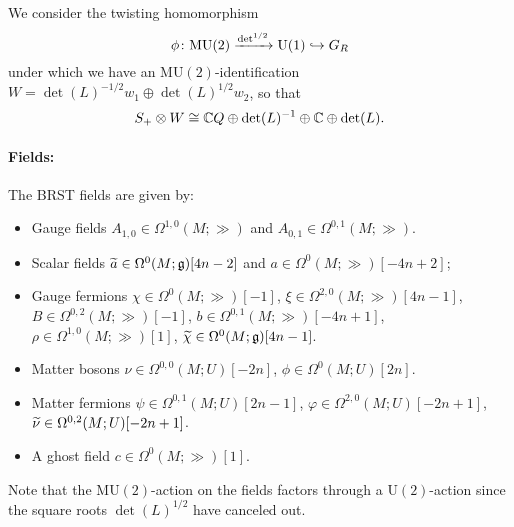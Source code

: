 \documentclass[10pt, oneside]{article}
\newcommand{\MU}{\mathrm{MU}}
\renewcommand{\U}{\mathrm{U}}
\begin{document}
We consider the twisting homomorphism 
\[
\phi \colon \MU(2) \xto{\det^{1/2}} \U(1) \hookrightarrow G_R
\]
under which we have an $\MU(2)$-identification $W=\det(L)^{-1/2}w_1 \oplus \det(L)^{1/2}w_2$, so that
\[S_+\otimes W\cong \CC Q\oplus \det(L)^{-1}\oplus \CC\oplus \det(L).\]

\vspace{-10pt}
\paragraph{Fields:} The BRST fields are given by:
\begin{itemize}
\item Gauge fields $A_{1, 0}\in\Omega^{1, 0}(M; \gg)$ and $A_{0, 1}\in\Omega^{0, 1}(M; \gg)$.
\item Scalar fields $\Tilde{a} \in \Omega^{0}(M; \gg)[4n-2]$ and $a \in\Omega^{0}(M; \gg)[-4n+2]$;
\item Gauge fermions $\chi \in \Omega^0(M ; \gg)[-1]$, $\xi \in \Omega^{2,0}(M ; \gg)[4n-1]$, $B \in \Omega^{0,2}(M ; \gg)[-1]$, $b \in \Omega^{0,1}(M ; \gg)[-4n+1]$, $\rho \in \Omega^{1,0}(M ; \gg)[1]$,  $\Tilde{\chi} \in \Omega^0(M ; \gg)[4n-1]$.
\item Matter bosons $\nu\in\Omega^{0,0}(M; U)[-2n]$, $\phi\in\Omega^0(M; U)[2n]$.
\item Matter fermions $\psi \in \Omega^{0,1} (M ;  U)[2n-1]$, $\varphi \in \Omega^{2,0} (M ; U)[-2n+1]$, $\Tilde{\nu} \in \Omega^{0,2}(M ; U)[-2n+1]$.
\item A ghost field $c\in \Omega^0(M; \gg)[1]$.
\end{itemize}

Note that the $\MU(2)$-action on the fields factors through a $\U(2)$-action since the square roots $\det(L)^{1/2}$ have canceled out.
\end{document}
